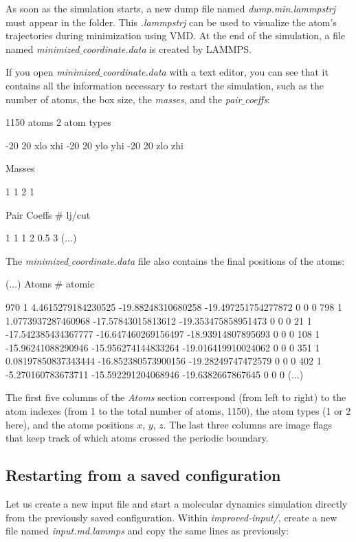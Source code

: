 \vspace{0.25cm} \noindent As soon as the simulation starts, a new dump file named
\textit{dump.min.lammpstrj} must appear in the folder.
This \textit{.lammpstrj} can be used to visualize the
atom's trajectories during minimization using VMD.
At the end of the simulation, a file named
\textit{minimized$\_$coordinate.data} is created by LAMMPS.

\vspace{0.25cm} \noindent If you open \textit{minimized$\_$coordinate.data} with a text editor,
you can see that it contains all the information necessary to
restart the simulation, such as the number of atoms, the box
size, the \textit{masses}, and the \textit{pair$\_$coeffs}:

\begin{lcverbatim}
1150 atoms
2 atom types

-20 20 xlo xhi
-20 20 ylo yhi
-20 20 zlo zhi

Masses

1 1
2 1

Pair Coeffs # lj/cut

1 1 1
2 0.5 3
(...)
\end{lcverbatim}

\noindent The \textit{minimized$\_$coordinate.data} file also contains the final
positions of the atoms:

\begin{lcverbatim}
(...)
Atoms # atomic

970 1 4.4615279184230525 -19.88248310680258 -19.497251754277872 0 0 0
798 1 1.0773937287460968 -17.57843015813612 -19.353475858951473 0 0 0
21 1 -17.542385434367777 -16.647460269156497 -18.93914807895693 0 0 0
108 1 -15.96241088290946 -15.956274144833264 -19.016419910024062 0 0 0
351 1 0.08197850837343444 -16.852380573900156 -19.28249747472579 0 0 0
402 1 -5.270160783673711 -15.592291204068946 -19.6382667867645 0 0 0
(...)
\end{lcverbatim}

\noindent The first five columns of the \textit{Atoms} section
correspond (from left to right) to the atom indexes (from 1
to the total number of atoms, 1150), the atom types (1 or 2
here), and the atoms positions $x$, $y$, $z$.
The last three columns are image flags that keep track of which
atoms crossed the periodic boundary.

\subsection{Restarting from a saved configuration}
\noindent Let us create a new input file and start a
molecular dynamics simulation directly from the previously
saved configuration. Within \textit{improved-input/}, create a new file
named \textit{input.md.lammps} and copy the same lines as previously:

